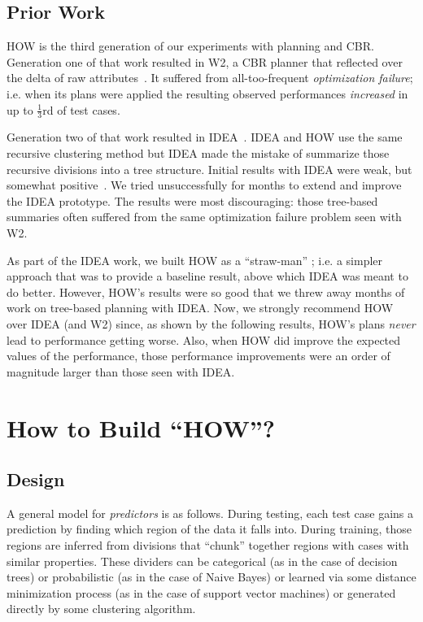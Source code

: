 \documentclass[conference]{IEEEtran}
\begin{document}
\subsection{Prior Work}
HOW is the third
generation of our experiments with planning and CBR.
Generation one of that work resulted in
 W2, a CBR planner that reflected over the delta of raw  attributes~\cite{6600685}. It suffered from all-too-frequent {\em optimization failure}; i.e. when its plans were applied the resulting observed
performances {\em increased} in up to $\frac{1}{3}$rd of test cases.

Generation two of that work resulted in  IDEA~\cite{me12c}.
IDEA and HOW use the    same recursive clustering
method but IDEA made the mistake of  summarize those
recursive divisions into a tree structure. Initial results with IDEA were weak, but somewhat
positive~\cite{me12c}. We tried unsuccessfully for  months to extend and improve
the IDEA prototype. The results were most discouraging: those tree-based summaries often suffered
from the same optimization failure problem seen with W2. 

As part of the IDEA work, we built HOW as a ``straw-man'' ; i.e. a  simpler
approach that was  to provide a baseline result,  above which IDEA was meant
to do better.   However, HOW's results were so good that we  threw away months
of work on tree-based planning with IDEA. Now, we strongly recommend HOW
over IDEA (and W2) since, as shown by the following results, HOW's plans {\em never} lead to performance getting worse. Also, when HOW did improve the expected values of the performance,
those performance improvements were an order of magnitude larger than those seen
with IDEA.






\section{How to Build ``HOW''?}\label{sec:mm}

\subsection{Design}
A general model for {\em predictors} is as follows. 
During testing, each test case gains a prediction 
by finding which region of the data it falls into.
During training, those regions are inferred from
divisions that ``chunk'' together regions with cases
with similar properties. These dividers can be categorical (as in the case of decision trees) or probabilistic (as in the
case of Naive Bayes) or learned via some distance minimization
process 
(as in the case of support vector machines) or generated
directly by some clustering algorithm. 
\end{document}
